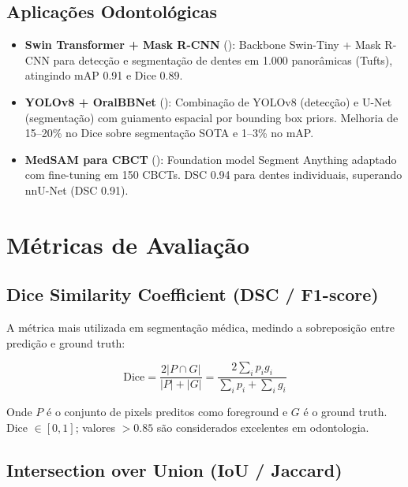 \subsection{Aplicações Odontológicas}

\begin{itemize}
  \item \textbf{Swin Transformer + Mask R-CNN} ():
        Backbone Swin-Tiny + Mask R-CNN para detecção e segmentação de dentes
        em 1.000 panorâmicas (Tufts), atingindo mAP 0.91 e Dice 0.89.
  \item \textbf{YOLOv8 + OralBBNet} ():
        Combinação de YOLOv8 (detecção) e U-Net (segmentação) com guiamento
        espacial por bounding box priors. Melhoria de 15--20\% no Dice sobre
        segmentação SOTA e 1--3\% no mAP.
  \item \textbf{MedSAM para CBCT} (): Foundation model
        Segment Anything adaptado com fine-tuning em 150 CBCTs. DSC 0.94 para
        dentes individuais, superando nnU-Net (DSC 0.91).
\end{itemize}

\section{Métricas de Avaliação}
\label{sec:metricas-segmentacao}

\subsection{Dice Similarity Coefficient (DSC / F1-score)}

A métrica mais utilizada em segmentação médica, medindo a sobreposição entre
predição e ground truth:

\begin{equation}
  \text{Dice} = \frac{2 |P \cap G|}{|P| + |G|} = \frac{2 \sum_i p_i g_i}{\sum_i p_i + \sum_i g_i}
  \label{eq:dice}
\end{equation}

Onde $P$ é o conjunto de pixels preditos como foreground e $G$ é o ground truth.
Dice $\in [0, 1]$; valores $> 0.85$ são considerados excelentes em odontologia.

\subsection{Intersection over Union (IoU / Jaccard)}

